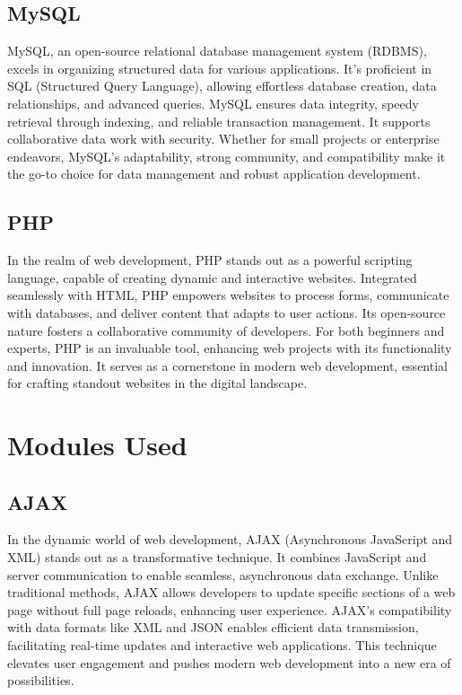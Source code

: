 \subsection{MySQL}
MySQL, an open-source relational database management system (RDBMS), excels in organizing structured data for various applications. It's proficient in SQL (Structured Query Language), allowing effortless database creation, data relationships, and advanced queries. MySQL ensures data integrity, speedy retrieval through indexing, and reliable transaction management. It supports collaborative data work with security. Whether for small projects or enterprise endeavors, MySQL's adaptability, strong community, and compatibility make it the go-to choice for data management and robust application development.
\subsection{PHP}
In the realm of web development, PHP stands out as a powerful scripting language, capable of creating dynamic and interactive websites. Integrated seamlessly with HTML, PHP empowers websites to process forms, communicate with databases, and deliver content that adapts to user actions. Its open-source nature fosters a collaborative community of developers. For both beginners and experts, PHP is an invaluable tool, enhancing web projects with its functionality and innovation. It serves as a cornerstone in modern web development, essential for crafting standout websites in the digital landscape.
\section{Modules Used}
\subsection{AJAX}
In the dynamic world of web development, AJAX (Asynchronous JavaScript and XML) stands out as a transformative technique. It combines JavaScript and server communication to enable seamless, asynchronous data exchange. Unlike traditional methods, AJAX allows developers to update specific sections of a web page without full page reloads, enhancing user experience. AJAX's compatibility with data formats like XML and JSON enables efficient data transmission, facilitating real-time updates and interactive web applications. This technique elevates user engagement and pushes modern web development into a new era of possibilities.
